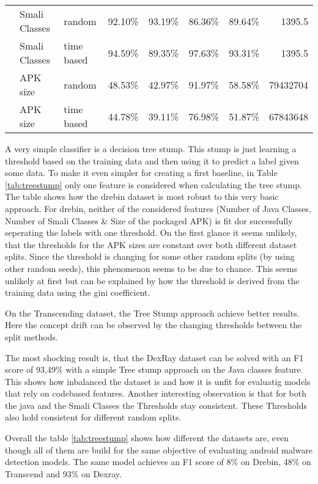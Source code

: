 \begin{table*}[t!]
{\begin{tabularx}{\linewidth}{@{}l l l r r r r r@{}}
                   & Smali Classes & random    & 92.10\% & 93.19\% & 86.36\% & 89.64\% & 1395.5 \\
                   & Smali Classes & time based & 94.59\% & 89.35\% & 97.63\% & 93.31\% & 1395.5 \\
                   & APK size     & random     & 48.53\% & 42.97\% & 91.97\% & 58.58\% & 79432704 \\
                   & APK size & time based & 44.78\% & 39.11\% & 76.98\% & 51.87\% & 67843648 \\
            \bottomrule
        \end{tabularx}
    }
\end{table*}

A very simple classifier is a decision tree stump.
This stump is just learning a threshold based on the training data and then using it to predict a label given some data.
To make it even simpler for creating a first baseline, in Table \ref{tab:treestump} only one feature is considered when calculating the tree stump.
The table shows how the drebin dataset is most robust to this very basic approach.
For drebin, neither of the considered features (Number of Java Classes, Number of Smali Classes \& Size of the packaged APK)
is fit dor successfully seperating the labels with one threshold.
On the first glance it seems unlikely, that the thresholds for the APK sizes are constant over both different dataset splits.
Since the threshold is changing for some other random splits (by using other random seeds),
this phenomenon seems to be due to chance.
This seems unlikely at first but can be explained by how the threshold is derived from the training data
using the gini coefficient.

On the Transcending dataset, the Tree Stump approach achieve better results.
Here the concept drift can be observed by the changing thresholds between the split methods.

The most shocking result is, that the DexRay dataset can be solved with an F1 score of 93,49\% 
with a simple Tree stump approach on the Java classes feature.
This shows how inbalanced the dataset is and how it is unfit for evaluatig models that rely on codebased features.
Another interesting observation is that for both the java and the Smali Classes the Thresholds stay consistent.
These Thresholds also hold consistent for different random splits.

Overall the table \ref{tab:treestump} shows how different the datasets are, 
even though all of them are build for the same objective of evaluating android malware detection models.
The same model achieves an F1 score of 8\% on Drebin, 48\% on Transcend and 93\% on Dexray.

